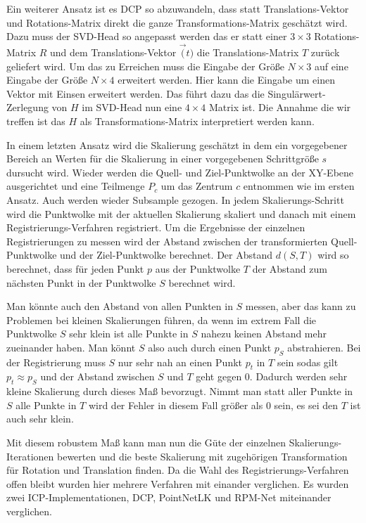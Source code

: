 \documentclass[12pt,titlepage, twoside]{article}
\begin{document}
Ein weiterer Ansatz ist es DCP so abzuwandeln, dass statt Translations-Vektor und Rotations-Matrix direkt die ganze Transformations-Matrix geschätzt wird. 
Dazu muss der SVD-Head so angepasst werden das er statt einer $3\times 3$ Rotations-Matrix $R$ und dem Translations-Vektor $\vec(t)$ die Translations-Matrix $T$ zurück geliefert wird.
Um das zu Erreichen muss die Eingabe der Größe $N\times 3$ auf eine Eingabe der Größe $N\times 4$ erweitert werden. Hier kann die Eingabe um einen Vektor mit Einsen erweitert werden.
Das führt dazu das die Singulärwert-Zerlegung von $H$ im SVD-Head nun eine $4\times 4$ Matrix ist. Die Annahme die wir treffen ist das $H$ als Transformations-Matrix interpretiert werden kann.

In einem letzten Ansatz wird die Skalierung geschätzt in dem ein vorgegebener Bereich an Werten für die Skalierung in einer vorgegebenen Schrittgröße $s$ dursucht wird.
Wieder werden die Quell- und Ziel-Punktwolke an der XY-Ebene ausgerichtet und eine Teilmenge $P_c$ um das Zentrum $c$ entnommen wie im ersten Ansatz. Auch werden wieder Subsample gezogen.
In jedem Skalierungs-Schritt wird die Punktwolke mit der aktuellen Skalierung skaliert und danach mit einem Registrierungs-Verfahren registriert.
Um die Ergebnisse der einzelnen Registrierungen zu messen wird der Abstand zwischen der transformierten Quell-Punktwolke und der Ziel-Punktwolke berechnet. 
Der Abstand $d(S,T)$ wird so berechnet, dass für jeden Punkt $p$ aus der Punktwolke $T$ der Abstand zum nächsten Punkt in der Punktwolke $S$ berechnet wird.

Man könnte auch den Abstand von allen Punkten in $S$ messen, aber das kann zu Problemen bei kleinen Skalierungen führen, da wenn im extrem Fall die Punktwolke $S$ sehr klein ist alle Punkte in $S$ nahezu keinen Abstand mehr zueinander haben.
Man könnt $S$ also auch durch einen Punkt $p_{S}$ abstrahieren.
Bei der Registrierung muss $S$ nur sehr nah an einen Punkt $p_t$ in $T$ sein sodas gilt $p_t \approx p_S$ und der Abstand zwischen $S$ und $T$ geht gegen $0$. Dadurch werden sehr kleine Skalierung durch dieses Maß bevorzugt.
Nimmt man statt aller Punkte in $S$ alle Punkte in $T$ wird der Fehler in diesem Fall größer als 0 sein, es sei den $T$ ist auch sehr klein.

Mit diesem robustem Maß kann man nun die Güte der einzelnen Skalierungs-Iterationen bewerten und die beste Skalierung mit zugehörigen Transformation für Rotation und Translation finden.
Da die Wahl des Registrierungs-Verfahren offen bleibt wurden hier mehrere Verfahren mit einander verglichen. Es wurden zwei ICP-Implementationen, DCP, PointNetLK und RPM-Net miteinander verglichen.
\end{document}
